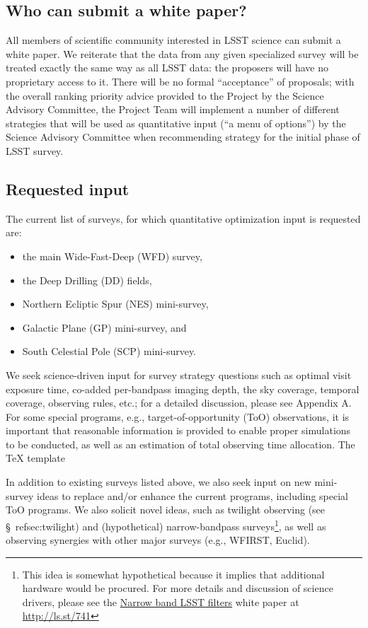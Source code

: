 \documentclass[DM,lsstdraft,toc,usenatbib]{lsstdoc}
\begin{document}
\subsection{Who can submit a white paper?} 

All members of scientific community interested in LSST science can submit a white paper. 
We reiterate that the data from any given specialized survey will be treated exactly the same 
way as all LSST data: the proposers will have no proprietary access to it. There will be no 
formal ``acceptance'' of proposals; with the overall ranking priority advice provided to the 
Project by the Science Advisory Committee, the Project Team will implement a number of
different strategies that will be used as quantitative input (``a menu of options'') by the 
Science Advisory Committee when recommending strategy for the initial phase of LSST survey. 


\subsection{Requested input}

The current list of surveys, for which quantitative optimization input is requested are:
\begin{itemize}
\item the main Wide-Fast-Deep (WFD) survey,
\item the Deep Drilling (DD) fields,
\item Northern Ecliptic Spur (NES) mini-survey, 
\item Galactic Plane (GP) mini-survey, and
\item South Celestial Pole (SCP) mini-survey.
\end{itemize}

We seek science-driven input for survey strategy questions such as optimal visit exposure time,
co-added per-bandpass imaging depth, the sky coverage, temporal coverage, observing
rules, etc.; for a detailed discussion, please see Appendix A. For some special programs, 
e.g., target-of-opportunity (ToO) observations, it is important that reasonable
information is provided to enable proper simulations to be conducted, as well as an estimation
of total observing time allocation. The TeX template

In addition to existing surveys listed above, we also seek input on new mini-survey ideas 
to replace and/or enhance the current programs, including special ToO programs. We also 
solicit novel ideas, such as twilight observing (see \S~ref{sec:twilight}) 
and (hypothetical) narrow-bandpass surveys\footnote{This idea is somewhat hypothetical 
because it implies that additional hardware would be procured. For more details and 
discussion of science drivers, please see the \href{http://ls.st/741}{Narrow band LSST filters} white paper at \url{http://ls.st/741}}, 
as well as observing synergies with other major surveys (e.g., WFIRST, Euclid). 
\end{document}
